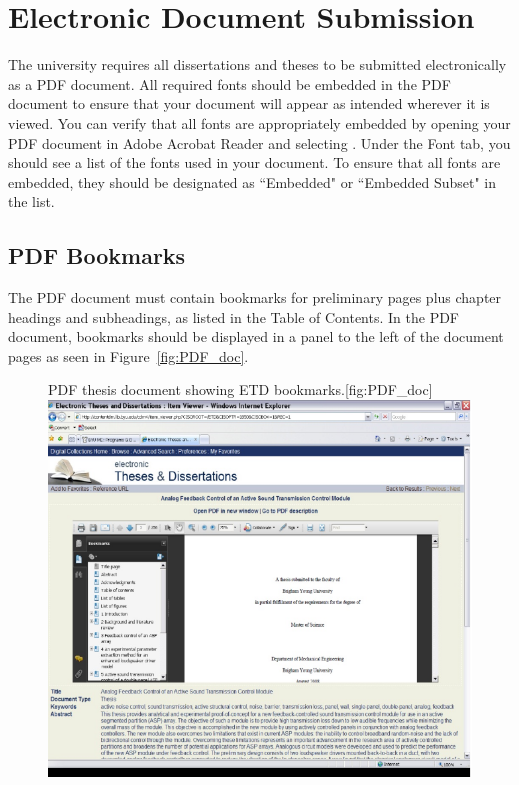 \chapter{Electronic Document Submission}
\label{ap:elect_doc}

The university requires all dissertations and theses to be submitted electronically as 
a PDF document. All required fonts should be embedded in the PDF document to ensure that
your document will appear as intended wherever it is viewed. You can verify that all fonts
are appropriately embedded by opening your PDF document in Adobe Acrobat Reader and selecting
{}. Under the Font tab, you should see a list of the fonts used in your document.
To ensure that all fonts are embedded, they should be designated as ``Embedded" or ``Embedded 
Subset" in the list.

\section{PDF Bookmarks}
The PDF document must contain bookmarks for preliminary pages plus chapter headings and 
subheadings, as listed in the Table of Contents. In the PDF document, bookmarks should be 
displayed in a panel to the left of the document pages as seen in Figure~\ref{fig:PDF_doc}. 

\begin{figure}[htbp]
	\begin{sidecaption}{PDF thesis document showing ETD bookmarks.}[fig:PDF_doc]
		\centering
		\includegraphics[width=4.5in]{figures/PDF_doc}
	\end{sidecaption}
\end{figure}

